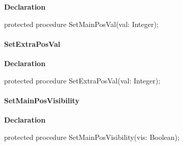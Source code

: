 \documentclass{report}
\newif\ifpdf
\begin{document}
\label{ipkhandle.TInstallation-SetMainPosVal}
\begin{list}{}{
\setlength{\itemindent}{0cm}
\setlength{\listparindent}{0cm}
\setlength{\leftmargin}{\evensidemargin}
\addtolength{\leftmargin}{\tmplength}
\settowidth{\labelsep}{X}
\addtolength{\leftmargin}{\labelsep}
\setlength{\labelwidth}{\tmplength}
}
\item[\textbf{Declaration}\hfill]
\ifpdf
\begin{flushleft}
\fi
\begin{ttfamily}
protected procedure SetMainPosVal(val: Integer);\end{ttfamily}

\ifpdf
\end{flushleft}
\fi

\end{list}
\paragraph*{SetExtraPosVal}\hspace*{\fill}

\label{ipkhandle.TInstallation-SetExtraPosVal}
\begin{list}{}{
\setlength{\itemindent}{0cm}
\setlength{\listparindent}{0cm}
\setlength{\leftmargin}{\evensidemargin}
\addtolength{\leftmargin}{\tmplength}
\settowidth{\labelsep}{X}
\addtolength{\leftmargin}{\labelsep}
\setlength{\labelwidth}{\tmplength}
}
\item[\textbf{Declaration}\hfill]
\ifpdf
\begin{flushleft}
\fi
\begin{ttfamily}
protected procedure SetExtraPosVal(val: Integer);\end{ttfamily}

\ifpdf
\end{flushleft}
\fi

\end{list}
\paragraph*{SetMainPosVisibility}\hspace*{\fill}

\label{ipkhandle.TInstallation-SetMainPosVisibility}
\begin{list}{}{
\setlength{\itemindent}{0cm}
\setlength{\listparindent}{0cm}
\setlength{\leftmargin}{\evensidemargin}
\addtolength{\leftmargin}{\tmplength}
\settowidth{\labelsep}{X}
\addtolength{\leftmargin}{\labelsep}
\setlength{\labelwidth}{\tmplength}
}
\item[\textbf{Declaration}\hfill]
\ifpdf
\begin{flushleft}
\fi
\begin{ttfamily}
protected procedure SetMainPosVisibility(vis: Boolean);\end{ttfamily}

\ifpdf
\end{flushleft}
\fi

\end{list}
\end{document}
